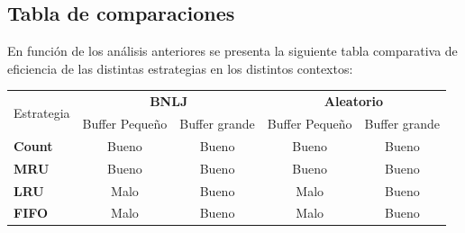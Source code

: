 \subsection{Tabla de comparaciones}
En funci\'on de los an\'alisis anteriores se presenta la siguiente tabla comparativa de eficiencia de las distintas estrategias en los distintos contextos:
\begin{center}
  \begin{tabular}{ | l | c | c | c | c | }
    \hline
    \multirow{2}{*}{Estrategia} & \multicolumn{2}{c|}{\textbf{BNLJ}} & \multicolumn{2}{c|}{\textbf{Aleatorio}} \\
    & Buffer Peque\~no & Buffer grande & Buffer Peque\~no & Buffer grande \\ \hline
    \textbf{Count} & Bueno & Bueno & Bueno & Bueno \\ \hline
    \textbf{MRU} & Bueno & Bueno & Bueno & Bueno \\ \hline
    \textbf{LRU} & Malo & Bueno & Malo & Bueno \\ \hline
    \textbf{FIFO} & Malo & Bueno & Malo & Bueno \\ \hline
  \end{tabular}
\end{center}